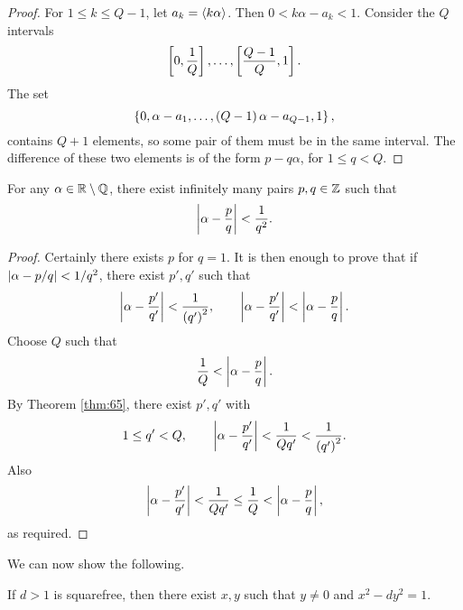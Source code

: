 \begin{proof}
For $ 1 \le k \le Q - 1 $, let $ a_k = \fb{k\alpha} $. Then $ 0 < k\alpha - a_k < 1 $. Consider the $ Q $ intervals
$$ \sb{0, \dfrac{1}{Q}}, \dots, \sb{\dfrac{Q - 1}{Q}, 1}. $$
The set
$$ \cb{0, \alpha - a_1, \dots, \rb{Q - 1}\alpha - a_{Q - 1}, 1}, $$
contains $ Q + 1 $ elements, so some pair of them must be in the same interval. The difference of these two elements is of the form $ p - q\alpha $, for $ 1 \le q < Q $.
\end{proof}

\begin{corollary}
\label{cor:66}
For any $ \alpha \in \R \setminus \Q $, there exist infinitely many pairs $ p, q \in \Z $ such that
$$ \abs{\alpha - \dfrac{p}{q}} < \dfrac{1}{q^2}. $$
\end{corollary}

\begin{proof}
Certainly there exists $ p $ for $ q = 1 $. It is then enough to prove that if $ \abs{\alpha - p / q} < 1 / q^2 $, there exist $ p', q' $ such that
$$ \abs{\alpha - \dfrac{p'}{q'}} < \dfrac{1}{\rb{q'}^2}, \qquad \abs{\alpha - \dfrac{p'}{q'}} < \abs{\alpha - \dfrac{p}{q}}. $$
Choose $ Q $ such that
$$ \dfrac{1}{Q} < \abs{\alpha - \dfrac{p}{q}}. $$
By Theorem \ref{thm:65}, there exist $ p', q' $ with
$$ 1 \le q' < Q, \qquad \abs{\alpha - \dfrac{p'}{q'}} < \dfrac{1}{Qq'} < \dfrac{1}{\rb{q'}^2}. $$
Also
$$ \abs{\alpha - \dfrac{p'}{q'}} < \dfrac{1}{Qq'} \le \dfrac{1}{Q} < \abs{\alpha - \dfrac{p}{q}}, $$
as required.
\end{proof}

We can now show the following.

\begin{theorem}
If $ d > 1 $ is squarefree, then there exist $ x, y $ such that $ y \ne 0 $ and $ x^2 - dy^2 = 1 $.
\end{theorem}

